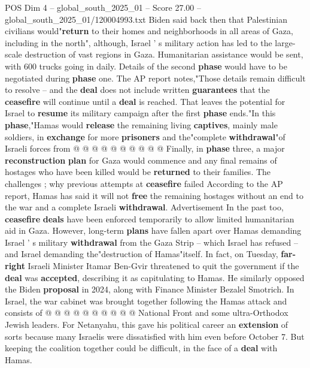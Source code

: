 \begin{textsample}{POS Dim 4 – global\_south\_2025\_01 – Score 27.00 – global\_south\_2025\_01/120004993.txt}
Biden said back then that Palestinian civilians would"\textbf{return} to their homes and neighborhoods in all areas of Gaza, including in the north", although, Israel ' s military action has led to the large-scale destruction of vast regions in Gaza.
Humanitarian assistance would be sent, with 600 trucks going in daily.
Details of the second \textbf{phase} would have to be negotiated during \textbf{phase} one.
The AP report notes,"Those details remain difficult to resolve -- and the \textbf{deal} does not include written \textbf{guarantees} that the \textbf{ceasefire} will continue until a \textbf{deal} is reached.
That leaves the potential for Israel to \textbf{resume} its military campaign after the first \textbf{phase} ends."In this \textbf{phase},"Hamas would \textbf{release} the remaining living \textbf{captives}, mainly male soldiers, in \textbf{exchange} for more \textbf{prisoners} and the"complete \textbf{withdrawal}"of Israeli forces from @ @ @ @ @ @ @ @ @ @ Finally, in \textbf{phase} three, a major \textbf{reconstruction} \textbf{plan} for Gaza would commence and any final remains of hostages who have been killed would be \textbf{returned} to their families.
The challenges ; why previous attempts at \textbf{ceasefire} failed According to the AP report, Hamas has said it will not \textbf{free} the remaining hostages without an end to the war and a complete Israeli \textbf{withdrawal}.
Advertisement In the past too, \textbf{ceasefire} \textbf{deals} have been enforced temporarily to allow limited humanitarian aid in Gaza.
However, long-term \textbf{plans} have fallen apart over Hamas demanding Israel ' s military \textbf{withdrawal} from the Gaza Strip -- which Israel has refused -- and Israel demanding the"destruction of Hamas"itself.
In fact, on Tuesday, \textbf{far-right} Israeli Minister Itamar Ben-Gvir threatened to quit the government if the \textbf{deal} was \textbf{accepted}, describing it as capitulating to Hamas.
He similarly opposed the Biden \textbf{proposal} in 2024, along with Finance Minister Bezalel Smotrich.
In Israel, the war cabinet was brought together following the Hamas attack and consists of @ @ @ @ @ @ @ @ @ @ National Front and some ultra-Orthodox Jewish leaders.
For Netanyahu, this gave his political career an \textbf{extension} of sorts because many Israelis were dissatisfied with him even before October 7.
But keeping the coalition together could be difficult, in the face of a \textbf{deal} with Hamas.

\end{textsample}
